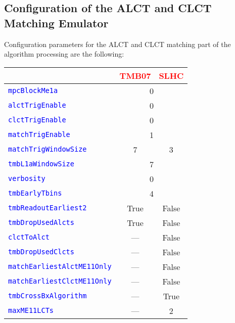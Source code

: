 \newpage

\subsection{Configuration of the ALCT and CLCT Matching Emulator}
\label{sec:TMB_conf}

Configuration parameters for the ALCT and CLCT matching part of the algorithm processing are the following:

\begin{center}
\begin{tabular}{|l|c|c|}
\hline
  & \textcolor{red}{TMB07} & \textcolor{red}{SLHC} \\
\hline
\hline
\textcolor{blue}{\texttt{mpcBlockMe1a}} & \multicolumn{2}{c|}{0} \\
\hline
\textcolor{blue}{\texttt{alctTrigEnable}} & \multicolumn{2}{c|}{0} \\
\hline
\textcolor{blue}{\texttt{clctTrigEnable}} & \multicolumn{2}{c|}{0} \\
\hline
\textcolor{blue}{\texttt{matchTrigEnable}} & \multicolumn{2}{c|}{1} \\
\hline
\textcolor{blue}{\texttt{matchTrigWindowSize}} & 7 & 3 \\
\hline
\textcolor{blue}{\texttt{tmbL1aWindowSize}} & \multicolumn{2}{c|}{7} \\
\hline
\textcolor{blue}{\texttt{verbosity}} & \multicolumn{2}{c|}{0} \\
\hline
\textcolor{blue}{\texttt{tmbEarlyTbins}} & \multicolumn{2}{c|}{4} \\
\hline
\textcolor{blue}{\texttt{tmbReadoutEarliest2}}  & True & False \\
\hline
\textcolor{blue}{\texttt{tmbDropUsedAlcts}} & True & False \\
\hline
\textcolor{blue}{\texttt{clctToAlct}} & --- & False \\
\hline
\textcolor{blue}{\texttt{tmbDropUsedClcts}} & --- & False \\
\hline
\textcolor{blue}{\texttt{matchEarliestAlctME11Only}} & --- & False \\
\hline
\textcolor{blue}{\texttt{matchEarliestClctME11Only}} & --- & False \\
\hline
\textcolor{blue}{\texttt{tmbCrossBxAlgorithm}} & --- & True \\
\hline
\textcolor{blue}{\texttt{maxME11LCTs}} & --- & 2 \\
\hline
\end{tabular}
\end{center}

